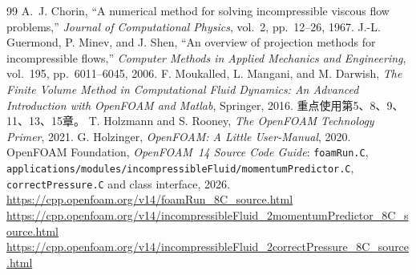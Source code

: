 \documentclass[UTF8,12pt,a4paper]{ctexart}
\numberwithin{equation}{section}
\begin{document}
\begin{thebibliography}{99}
A.~J. Chorin,
“A numerical method for solving incompressible viscous flow problems,”
\emph{Journal of Computational Physics}, vol.~2, pp.~12--26, 1967.
J.-L. Guermond, P. Minev, and J. Shen,
“An overview of projection methods for incompressible flows,”
\emph{Computer Methods in Applied Mechanics and Engineering},
vol.~195, pp.~6011--6045, 2006.
F. Moukalled, L. Mangani, and M. Darwish,
\emph{The Finite Volume Method in Computational Fluid Dynamics: An Advanced Introduction with OpenFOAM and Matlab},
Springer, 2016. 重点使用第5、8、9、11、13、15章。
T. Holzmann and S. Rooney, \emph{The OpenFOAM Technology Primer}, 2021.
G. Holzinger, \emph{OpenFOAM: A Little User-Manual}, 2020.
OpenFOAM Foundation, \emph{OpenFOAM~14 Source Code Guide}: 
\texttt{foamRun.C}, \texttt{applications/modules/incompressibleFluid/momentumPredictor.C},
\texttt{correctPressure.C} and class interface, 2026.\\
\url{https://cpp.openfoam.org/v14/foamRun_8C_source.html}\\
\url{https://cpp.openfoam.org/v14/incompressibleFluid_2momentumPredictor_8C_source.html}\\
\url{https://cpp.openfoam.org/v14/incompressibleFluid_2correctPressure_8C_source.html}
\end{thebibliography}
\end{document}
